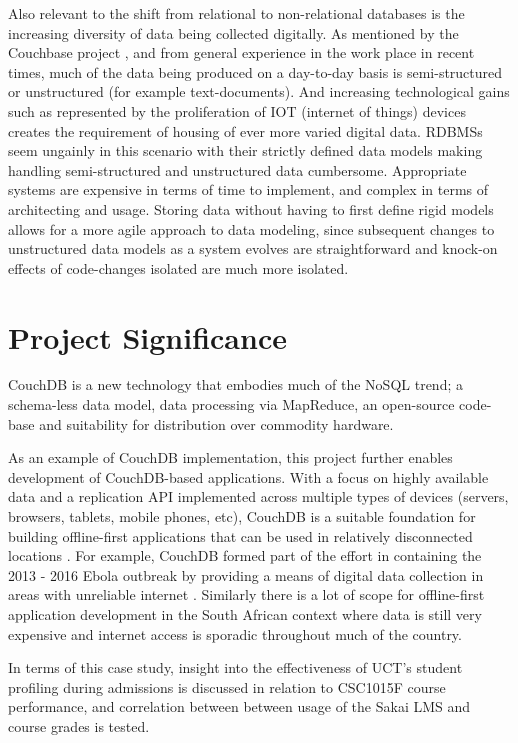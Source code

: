 Also relevant to the shift from relational to non-relational databases is the increasing diversity of data being collected digitally. As mentioned by the Couchbase project \cite{couchbaseWhitePaper}, and from general experience in the work place in recent times, much of the data being produced on a day-to-day basis is semi-structured or unstructured (for example text-documents). And increasing technological gains such as represented by the proliferation of IOT (internet of things) devices creates the requirement of housing of ever more varied digital data. RDBMSs seem ungainly in this scenario with their strictly defined data models making handling semi-structured and unstructured data cumbersome. Appropriate systems are expensive in terms of time to implement, and complex in terms of architecting and usage. Storing data without having to first define rigid models allows for a more agile approach to data modeling, since subsequent changes to unstructured data models as a system evolves are straightforward and knock-on effects of code-changes isolated are much more isolated.

\section{Project Significance}
CouchDB is a new technology that embodies much of the NoSQL trend; a schema-less data model, data processing via MapReduce, an open-source code-base and suitability for distribution over commodity hardware.

As an example of CouchDB implementation, this project further enables development of CouchDB-based applications. With a focus on highly available data and a replication API implemented across multiple types of devices (servers, browsers, tablets, mobile phones, etc), CouchDB is a suitable foundation for building offline-first applications that can be used in relatively disconnected locations \cite{ebola2017}. For example, CouchDB formed part of the effort in containing the 2013 - 2016 Ebola outbreak by providing a means of digital data collection in areas with unreliable internet \cite{ebola2017}. Similarly there is a lot of scope for offline-first application development in the South African context where data is still very expensive and internet access is sporadic throughout much of the country.

In terms of this case study, insight into the effectiveness of UCT's student profiling during admissions is discussed in relation to CSC1015F course performance, and correlation between between usage of the Sakai LMS and course grades is tested.


